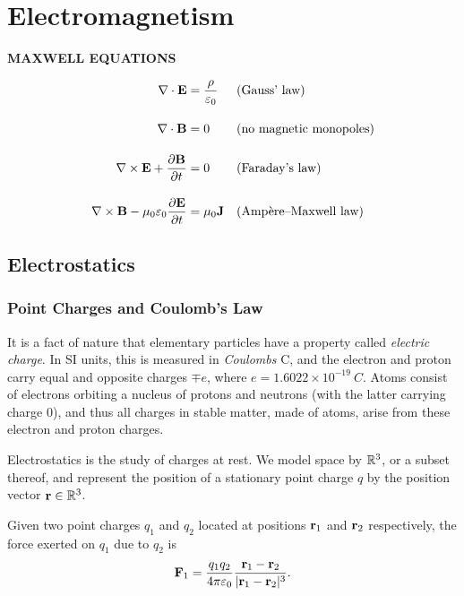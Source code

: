 \chapter{Electromagnetism}

\vfill

\begin{center}
\textbf{MAXWELL EQUATIONS}
\end{center}
\begin{mdframed}
\begin{align*}
\nabla\cdot\vb{E}&=\frac{\rho}{\varepsilon_0}&&\text{(Gauss' law)}\\[1em]
\nabla\cdot\vb{B}&=0&&\text{(no magnetic monopoles)}\\[1em]
\nabla\times\vb{E}+\pdv{\vb{B}}{t}&=0&&\text{(Faraday's law)}\\[1em]
\nabla\times\vb{B}-\mu_0\varepsilon_0\pdv{\vb{E}}{t}&=\mu_0\vb{J}&&\text{(Amp\`{e}re--Maxwell law)}
\end{align*}
\end{mdframed}

\vfill

\section{Electrostatics}
\subsection{Point Charges and Coulomb's Law}
It is a fact of nature that elementary particles have a property called \emph{electric charge}. In SI units, this is measured in \emph{Coulombs} C, and the electron and proton carry equal and opposite charges $\mp e$, where $e=1.6022\times10^{-19}\:\unit{C}$. Atoms consist of electrons orbiting a nucleus of protons and neutrons (with the latter carrying charge $0$), and thus all charges in stable matter, made of atoms, arise from these electron and proton charges.

Electrostatics is the study of charges at rest. We model space by $\mathbb R^3$, or a subset thereof, and represent the position of a stationary point charge $q$ by the position vector $\vb{r}\in\mathbb R^3$.

\begin{law}
Given two point charges $q_1$ and $q_2$ located at positions $\vb{r}_1$ and $\vb{r}_2$ respectively, the force exerted on $q_1$ due to $q_2$ is
\[\vb{F}_1=\frac{q_1q_2}{4\pi\varepsilon_0}\frac{\vb{r}_1-\vb{r}_2}{|\vb{r}_1-\vb{r}_2|^3}.\]
\end{law}

